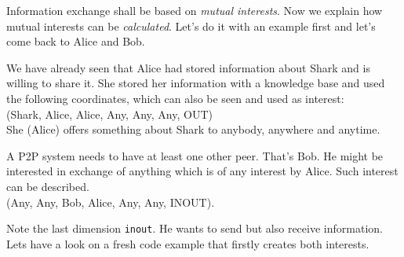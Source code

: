 Information exchange shall be based on {\it mutual interests}. Now we explain how mutual interests can be {\it calculated}. Let's do it with an example first and let's come back to Alice and Bob.

We have already seen that Alice had stored information about Shark and is willing to share it. She stored her information with a knowledge base and used the following coordinates, which can also be seen and used as interest:\\
(Shark, Alice, Alice, Any, Any, Any, OUT)\\
She (Alice) offers something about Shark to anybody, anywhere and anytime.

A P2P system needs to have at least one other peer. That's Bob. He might be interested in exchange of anything which is of any interest by Alice. Such interest can be described.\\
(Any, Any, Bob, Alice, Any, Any, INOUT).

Note the last dimension {\tt inout}. He wants to send but also receive  information. Lets have a look on a fresh code example that firstly creates both interests.

